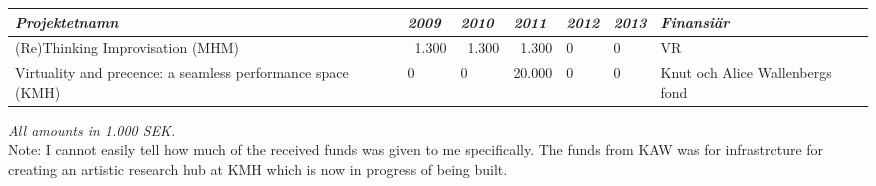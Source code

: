 

\begin{tabular}[c]{| p{3cm}|l|l|l|l|l|p{2cm}|}
\hline
  \emph{Projektetnamn} & \emph{2009} & \emph{2010} & \emph{2011} & \emph{2012} & \emph{2013} & \emph{Finansiär} \\ [0.2cm] \hline
  
  (Re)Thinking Improvisation (MHM) & ~1.300 & ~1.300 & ~1.300 & 0 & 0 & VR \\ [0.8cm] \hline
  Virtuality and precence: a seamless performance space (KMH) & 0 & 0 & 20.000 & 0 & 0 & Knut och Alice Wallenbergs fond \\ [0.3cm] \hline
\end{tabular}
\vspace{0.1cm}

\noindent
\emph{All amounts in 1.000 SEK.}\\

\vspace{0.3cm}
\noindent
Note: I cannot easily tell how much of the received funds was given to me specifically. The funds from KAW was for infrastrcture for creating an artistic research hub at KMH which is now in progress of being built.


